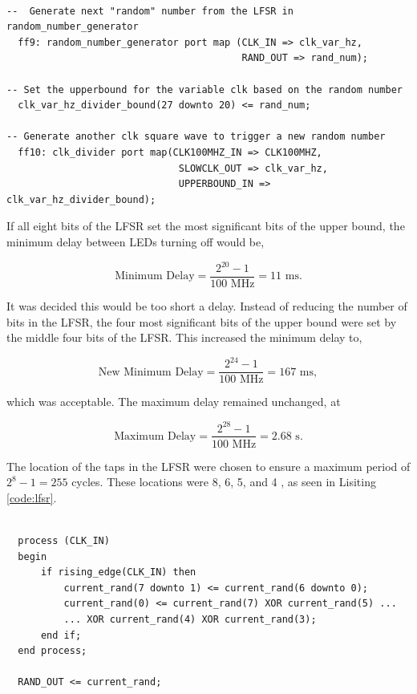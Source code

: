 \documentclass[12pt]{article}
\newenvironment{code}{\captionsetup{type=listing}}{}
\begin{document}
\begin{code}
\begin{verbatim}

--  Generate next "random" number from the LFSR in random_number_generator
  ff9: random_number_generator port map (CLK_IN => clk_var_hz,
                                         RAND_OUT => rand_num);
  
-- Set the upperbound for the variable clk based on the random number  
  clk_var_hz_divider_bound(27 downto 20) <= rand_num;

-- Generate another clk square wave to trigger a new random number
  ff10: clk_divider port map(CLK100MHZ_IN => CLK100MHZ,
                              SLOWCLK_OUT => clk_var_hz,
                              UPPERBOUND_IN => clk_var_hz_divider_bound);
\end{verbatim}
\captionsetup{belowskip=0pt}
\label{code:random_number_generation}
\end{code}

If all eight bits of the LFSR set the most significant bits of the upper bound, the minimum delay between LEDs turning off would be,

\[
\text{Minimum Delay} = \frac{2^{20} - 1}{100 \text{ MHz}} = 11 \text{ ms}.
\]

It was decided this would be too short a delay. Instead of reducing the number of bits in the LFSR, the four most significant bits of the upper bound were set by the middle four bits of the LFSR. This increased the minimum delay to,

\[
\text{New Minimum Delay} = \frac{2^{24} - 1}{100 \text{ MHz}} = 167\text{ ms},
\]

which was acceptable. The maximum delay remained unchanged, at

\[
\text{Maximum Delay} = \frac{2^{28} - 1}{100 \text{ MHz}} = 2.68 \text{ s}.
\]

The location of the taps in the LFSR were chosen to ensure a maximum period of $2^8 - 1 = 255$ cycles. These locations were 8, 6, 5, and 4 \cite{lfsr_taps}, as seen in Lisiting \ref{code:lfsr}.

\begin{code}
\begin{verbatim}

  process (CLK_IN)
  begin
      if rising_edge(CLK_IN) then
          current_rand(7 downto 1) <= current_rand(6 downto 0);
          current_rand(0) <= current_rand(7) XOR current_rand(5) ...
          ... XOR current_rand(4) XOR current_rand(3);
      end if;
  end process;

  RAND_OUT <= current_rand;
\end{verbatim}
\captionsetup{belowskip=0pt}
\label{code:lfsr}
\end{code}
\end{document}
